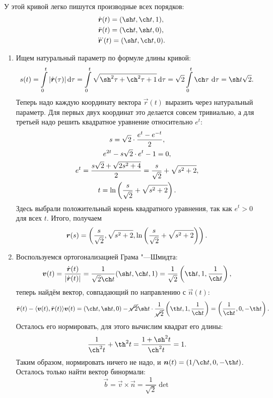 \begin{solution}
	У этой кривой легко пишутся производные всех порядков:
	\begin{gather*}
		\dot{\vec{r}}(t) = (\sh t, \ch t, 1),\\
		\ddot{\vec{r}}(t) = (\ch t, \sh t, 0),\\
		\dddot{\vec{r}}(t) = (\sh t, \ch t, 0).
	\end{gather*}
	\begin{enumerate}[nolistsep, label=(\arabic*)]
		\item Ищем натуральный параметр по формуле длины кривой:
			\[
				s(t) = \int\limits_0^t\abs{\dot{\vec{r}}(\tau)}\d\tau = \int\limits_0^t\sqrt{\sh^2\tau + \ch^2\tau + 1}\d\tau = \sqrt{2}\int\limits_0^t\ch\tau\,\d\tau = \sh t\sqrt{2}.
			\]
			Теперь надо каждую координату вектора $\vec{r}(t)$ выразить через натуральный параметр. Для первых двух координат это делается совсем тривиально, а для третьей надо решить квадратное уравнение относительно $e^t$:
			\begin{gather*}
				s = \sqrt{2} \cdot \frac{e^t - e^{-t}}{2},\\
				e^{2t} - s\sqrt{2} \cdot e^t - 1 = 0,\\
				e^t = \frac{s\sqrt{2} + \sqrt{2s^2 + 4}}{2} = \frac{s}{\sqrt{2}} + \sqrt{s^2 + 2},\\
				t = \ln\left(\frac{s}{\sqrt{2}} + \sqrt{s^2 + 2}\right).
			\end{gather*}
			Здесь выбрали положительный корень квадратного уравнения, так как $e^t > 0$ для всех $t$. Итого, получаем
			\[
				\boldsymbol{r}(s) = \left(\frac{s}{\sqrt{2}}, \sqrt{s^2 + 2}, \ln\left(\frac{s}{\sqrt{2}} + \sqrt{s^2 + 2}\right)\right).
			\]
		\item Воспользуемся ортогонализацией Грама "---Шмидта:
			\[
				\vec{v}(t) = \frac{\dot{\vec{r}}(t)}{\abs{\dot{\vec{r}}(t)}} = \frac{1}{\sqrt{2}\ch t}(\sh t, \ch t, 1) = \frac{1}{\sqrt{2}}\br{\th t, 1, \frac{1}{\ch t}},
			\]
			теперь найдём вектор, совпадающий по направлению с $\vec{n}(t)$:
			\[
				\ddot{\vec{r}}(t) - \langle \vec{v}(t), \ddot{\vec{r}}(t) \rangle\vec{v}(t) = (\ch t, \sh t, 0) - \cancel{\sqrt{2}}\sh t \cdot \frac{1}{\cancel{\sqrt{2}}}\br{\th t, 1, \frac{1}{\ch t}} = \br{\frac{1}{\ch t}, 0, -\th t}.
			\]
			Осталось его нормировать, для этого вычислим квадрат его длины:
			\[
				\frac{1}{\ch^2t} + \th^2t = \frac{1 + \sh^2t}{\ch^2t} = 1.
			\]
			Таким образом, нормировать ничего не надо, и $\vec{n}(t) = (1 / \ch t, 0, -\th t)$. Осталось только найти вектор бинормали:
			\[
				\vec{b} = \vec{v} \times \vec{n} = \frac{1}{\sqrt{2}}\det
\]
\end{enumerate}
\end{solution}
